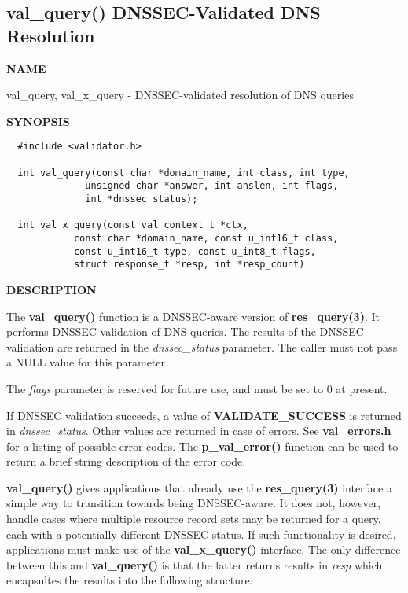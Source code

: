 \clearpage

\subsection{{\bf val\_query()} DNSSEC-Validated DNS Resolution}


{\bf NAME}

val\_query, val\_x\_query - DNSSEC-validated resolution of DNS queries

{\bf SYNOPSIS}

\begin{verbatim}
  #include <validator.h>

  int val_query(const char *domain_name, int class, int type,
              unsigned char *answer, int anslen, int flags,
              int *dnssec_status);

  int val_x_query(const val_context_t *ctx,
            const char *domain_name, const u_int16_t class,
            const u_int16_t type, const u_int8_t flags,
            struct response_t *resp, int *resp_count)
\end{verbatim}

{\bf DESCRIPTION}

The {\bf val\_query()} function is a DNSSEC-aware version of {\bf
res\_query(3)}.  It performs DNSSEC validation of DNS queries.  The results
of the DNSSEC validation are returned in the {\it dnssec\_status} parameter.
The caller must not pass a NULL value for this parameter.

The {\it flags} parameter is reserved for future use, and must be set to 0
at present.

If DNSSEC validation succeeds, a value of {\bf VALIDATE\_SUCCESS} is returned
in {\it dnssec\_status}.  Other values are returned in case of errors.  See
{\bf val\_errors.h} for a listing of possible error codes.  The {\bf
p\_val\_error()} function can be used to return a brief string description
of the error code.

{\bf val\_query()} gives applications that already use the {\bf res\_query(3)}
interface a simple way to transition towards being DNSSEC-aware.  It does
not, however, handle cases where multiple resource record sets may be returned
for a query, each with a potentially different DNSSEC status.  If such
functionality is desired, applications must make use of the {\bf
val\_x\_query()} interface.  The only difference between this and {\bf
val\_query()} is that the latter returns results in {\it resp} which
encapsultes the results into the following structure:

